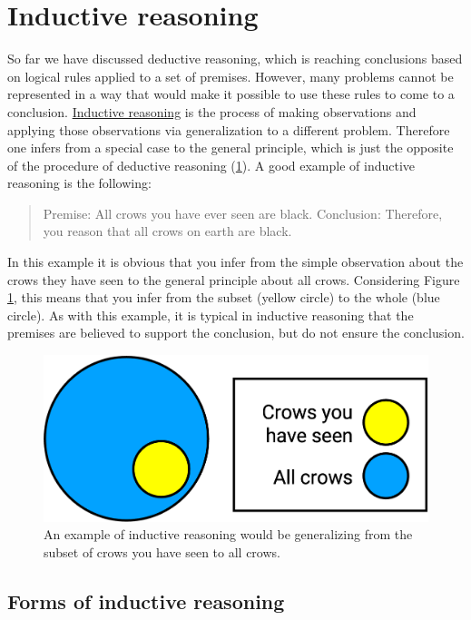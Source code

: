 \documentclass[
]{krantz}
\begin{document}
\section{Inductive reasoning}\label{inductive-reasoning}

So far we have discussed deductive reasoning, which is reaching conclusions based on logical rules applied to a set of premises. However, many problems cannot be represented in a way that would make it possible to use these rules to come to a conclusion. \hyperref[inductive-reasoning]{Inductive reasoning} is the process of making observations and applying those observations via generalization to a different problem. Therefore one infers from a special case to the general principle, which is just the opposite of the procedure of deductive reasoning (\ref{fig:induct}). A good example of inductive reasoning is the following:

\begin{quote}
Premise: All crows you have ever seen are black.
Conclusion: Therefore, you reason that all crows on earth are black.
\end{quote}

In this example it is obvious that you infer from the simple observation about the crows they have seen to the general principle about all crows. Considering Figure \ref{fig:induct}, this means that you infer from the subset (yellow circle) to the whole (blue circle). As with this example, it is typical in inductive reasoning that the premises are believed to support the conclusion, but do not ensure the conclusion.

\begin{figure}

{\centering \includegraphics[width=0.5\linewidth]{images/ch9/fig4} 

}

\caption{An example of inductive reasoning would be generalizing from the subset of crows you have seen to all crows.}\label{fig:induct}
\end{figure}

\subsection*{Forms of inductive reasoning}\label{forms-of-inductive-reasoning}
\end{document}
